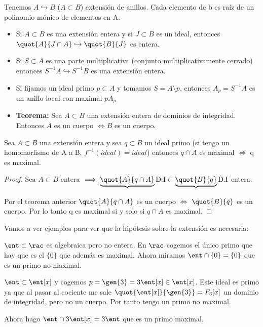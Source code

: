 Tenemos $A \hookrightarrow B$ ($A \subset B$) extensión de anillos. Cada elemento de b es raíz de un polinomio mónico de elementos en A.
\begin{itemize}
	\item Si $A \subset B$ es una extensión entera y si $J \subset B$ es un ideal, entonces $\quot{A}{J \cap A} \hookrightarrow \quot{B}{J}$ es entera.
	\item Si $S \subset A$ es una parte multiplicativa (conjunto multiplicativamente cerrado) entonces $S^{-1}A \hookrightarrow S^{-1}B$ es una extensión entera.
	\item Si fijamos un ideal primo $p \subset A$ y tomamos $S=A \setminus p$, entonces $A_p=S^{-1}A$ es un anillo local con maximal $pA_p$
	\item \textbf{Teorema:} Sea $A \subset B$ una extensión entera de dominios de integridad. Entonces $A$ es un cuerpo  $\Leftrightarrow B$ es un cuerpo.
\end{itemize}

\begin{prop}
	Sea $A \subset B$ una extensión entera y sea $q \subset B$ un ideal primo (si tengo un homomorfismo de A a B, $f^{-1}(ideal)=ideal$) entonces $q \cap A$ es maximal $\Leftrightarrow$ q es maximal.
	
\end{prop}

\begin{proof}
	Sea $A \subset B$ entera $\implies \underbrace{\quot{A}{q \cap A}}{\text{D.I}} \subset \underbrace{\quot{B}{q}}{\text{D.I}}$ entera.
	
	Por el teorema anterior $\quot{A}{q \cap A}$ es un cuerpo $\Leftrightarrow$ $\quot{B}{q}$ es un cuerpo. Por lo tanto q es maximal si y solo si $q \cap A$ es maximal.
\end{proof}


Vamos a ver ejemplos para ver que la hipótesis sobre la extensión es necesaria:
\begin{example}
	$\ent \subset \rac$ es algebraica pero no entera. En $\rac$ cogemos el único primo que hay que es el $\{0\}$ que además es maximal. Ahora miramos $\ent \cap \{0\}=\{0\}$ que es un primo no maximal.
\end{example}

\begin{example}
	$\ent \subset \ent[x]$ y cogemos $p=\gen{3}=3 \ent[x] \in \ent[x]$. Este ideal es primo ya que al pasar al cociente me sale $\quot{\ent[x]}{\gen{3}}=F_3[x]$ un dominio de integridad, pero no un cuerpo. Por tanto tengo un primo no maximal.
	
	Ahora hago $\ent \cap 3 \ent[x]=3 \ent$ que es un primo maximal.
\end{example}

